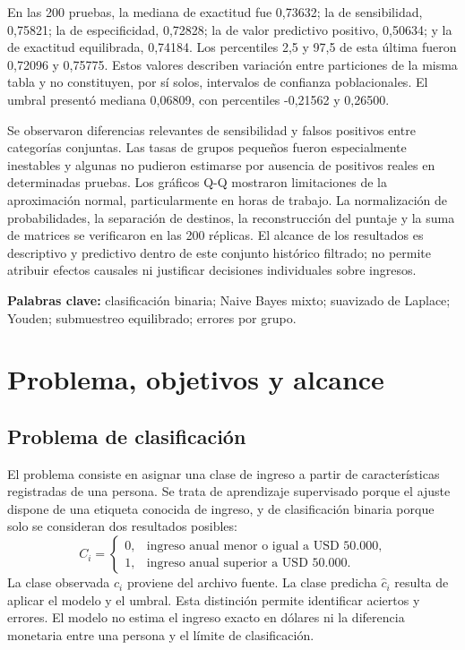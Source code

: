 \documentclass[11pt,a4paper]{article}
\begin{document}
En las 200 pruebas, la mediana de exactitud fue 0,73632; la de sensibilidad, 0,75821; la de especificidad, 0,72828; la de valor predictivo positivo, 0,50634; y la de exactitud equilibrada, 0,74184. Los percentiles 2,5 y 97,5 de esta última fueron 0,72096 y 0,75775. Estos valores describen variación entre particiones de la misma tabla y no constituyen, por sí solos, intervalos de confianza poblacionales. El umbral presentó mediana 0,06809, con percentiles -0,21562 y 0,26500.

Se observaron diferencias relevantes de sensibilidad y falsos positivos entre categorías conjuntas. Las tasas de grupos pequeños fueron especialmente inestables y algunas no pudieron estimarse por ausencia de positivos reales en determinadas pruebas. Los gráficos Q-Q mostraron limitaciones de la aproximación normal, particularmente en horas de trabajo. La normalización de probabilidades, la separación de destinos, la reconstrucción del puntaje y la suma de matrices se verificaron en las 200 réplicas. El alcance de los resultados es descriptivo y predictivo dentro de este conjunto histórico filtrado; no permite atribuir efectos causales ni justificar decisiones individuales sobre ingresos.

\textbf{Palabras clave:} clasificación binaria; Naive Bayes mixto; suavizado de Laplace; Youden; submuestreo equilibrado; errores por grupo.

\clearpage\begingroup\small\setlength{\parskip}{0pt}\tableofcontents\endgroup
\clearpage\begingroup\small\setlength{\parskip}{0pt}\listoftables\endgroup
\clearpage\begingroup\small\setlength{\parskip}{0pt}\listoffigures\endgroup
\clearpage{}

\section{Problema, objetivos y alcance}
\subsection{Problema de clasificación}
El problema consiste en asignar una clase de ingreso a partir de características registradas de una persona. Se trata de aprendizaje supervisado porque el ajuste dispone de una etiqueta conocida de ingreso, y de clasificación binaria porque solo se consideran dos resultados posibles:
\begin{equation}
C_i=\begin{cases}0,&\text{ingreso anual menor o igual a USD 50.000},\\
1,&\text{ingreso anual superior a USD 50.000}.\end{cases}
\end{equation}
La clase observada $c_i$ proviene del archivo fuente. La clase predicha $\widehat c_i$ resulta de aplicar el modelo y el umbral. Esta distinción permite identificar aciertos y errores. El modelo no estima el ingreso exacto en dólares ni la diferencia monetaria entre una persona y el límite de clasificación.
\end{document}

